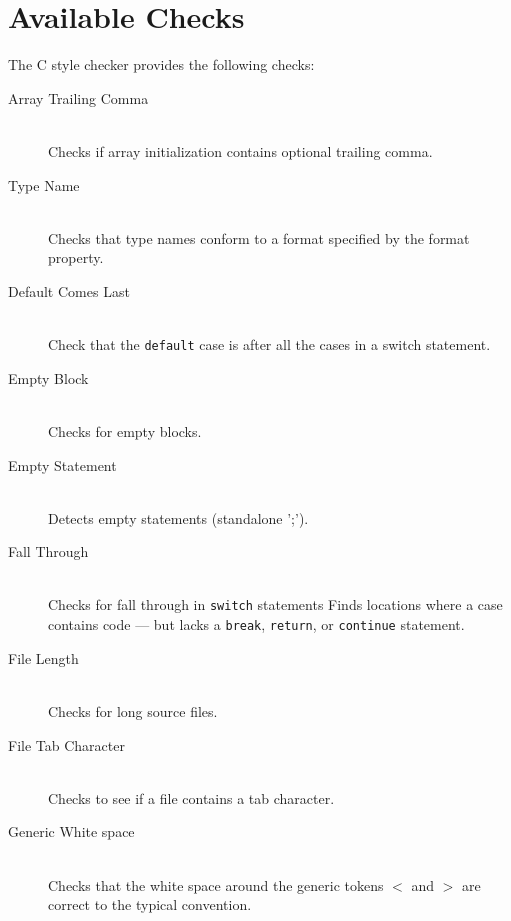 \chapter{Available Checks}
\label{chap:Available Checks}


    The C style checker provides the following checks:
    
    \begin{description}
        \item[Array Trailing Comma] \hfill \\ 
        Checks if array initialization contains optional trailing comma.
        
        \item[Type Name] \hfill \\
        Checks that type names conform to a format specified by the format property. 

        \item[Default Comes Last] \hfill \\
        Check that the \texttt{default} case is after all the cases in a switch statement. 


         \item[Empty Block] \hfill \\
        Checks for empty blocks.

        \item[Empty Statement] \hfill \\
        Detects empty statements (standalone ';').

        \item[Fall Through] \hfill \\
            Checks for fall through in \texttt{switch} statements Finds locations where a case contains code
            --- but lacks a \texttt{break}, \texttt{return}, or \texttt{continue} statement.

        \item[File Length] \hfill \\
        Checks for long source files.

        \item[File Tab Character] \hfill \\
        Checks to see if a file contains a tab character.

        \item[Generic White space] \hfill \\
        Checks that the white space around the generic tokens $<$ and $>$ are 
        correct to the typical convention.


\end{description}
